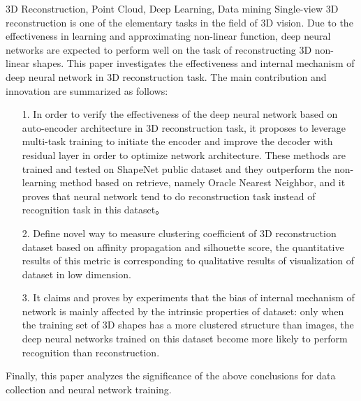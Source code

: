 \documentclass[bachelor, nocolorlinks, printoneside]{seuthesis} %
\begin{document}
\begin{englishabstract}{3D Reconstruction, Point Cloud, Deep Learning, Data mining}
    Single-view 3D reconstruction is one of the elementary tasks in the field of 3D vision. 
    Due to the effectiveness in learning and approximating non-linear function, deep neural networks are expected to perform well on the task of reconstructing 3D non-linear shapes.
    This paper investigates the effectiveness and internal mechanism of deep neural network in 3D reconstruction task. 
    The main contribution and innovation are summarized as follows:
    \begin{enumerate}
        \item[1.] In order to verify the effectiveness of the deep neural network based on auto-encoder architecture in 3D reconstruction task, 
        it proposes to leverage multi-task training to initiate the encoder and improve the decoder with residual layer in order to optimize network architecture. 
        These methods are trained and tested on ShapeNet public dataset and they outperform the non-learning method based on retrieve, namely Oracle Nearest Neighbor, 
        and it proves that neural network tend to do reconstruction task instead of recognition task in this dataset。

        \item[2.] Define novel way to measure clustering coefficient of 3D reconstruction dataset based on affinity propagation and silhouette score, the quantitative results of this metric is corresponding to qualitative results of visualization of dataset in low dimension.
        \item[3.] It claims and proves by experiments that the bias of internal mechanism of network 
        is mainly affected by the intrinsic properties of dataset: only when the training set of 3D shapes has a 
        more clustered structure than images, the deep neural networks trained on this dataset become more likely 
        to perform recognition than reconstruction.
    \end{enumerate}
    Finally, this paper analyzes the significance of the above conclusions for data collection and neural network training.
\end{englishabstract}

\tableofcontents
\end{document}
